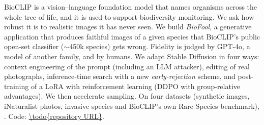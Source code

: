 BioCLIP is a vision--language foundation model that names organisms across the whole tree of life, and it is used
to support biodiversity monitoring. We ask how robust it is to realistic images it has never seen. We build
\emph{BioFool}, a generative application that produces faithful images of a given species that BioCLIP's public
open-set classifier ($\sim$450k species) gets wrong. Fidelity is judged by GPT-4o, a model of another family, and
by humans. We adapt Stable Diffusion in four ways: context engineering of the prompt (including an LLM attacker),
editing of real photographs, inference-time search with a new \emph{early-rejection} scheme, and post-training of a
LoRA with reinforcement learning (DDPO with group-relative advantages). We then accelerate sampling. On four datasets
(synthetic images, iNaturalist photos, invasive species and BioCLIP's own Rare Species benchmark), . Code: \url{\todo{repository URL}}.
